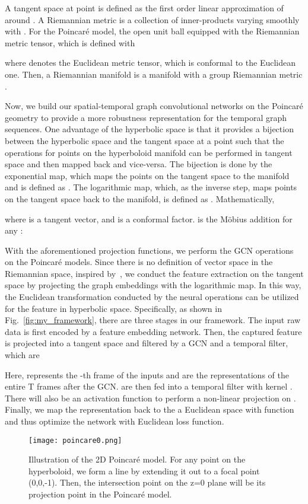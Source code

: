 \documentclass[letterpaper]{article} \usepackage{aaai19}  \usepackage{times}  \usepackage{helvet} \usepackage{courier}  \usepackage[hyphens]{url}  \usepackage{graphicx} \urlstyle{rm} \def\UrlFont{\rm}  \usepackage{graphicx}  \frenchspacing  \setlength{\pdfpagewidth}{8.5in}  \setlength{\pdfpageheight}{11in}
\begin{document}
A tangent space  at point  is defined as the first order linear approximation of  around .
A Riemannian metric  is a collection of inner-products  varying smoothly with . For the Poincar\'e model, the open unit ball equipped with the Riemannian metric tensor, which is defined with

where  denotes the Euclidean metric tensor, which is conformal to the Euclidean one. Then, a Riemannian manifold  is a manifold  with a group Riemannian metric . 

Now, we build our spatial-temporal graph convolutional networks on the Poincar\'e geometry to provide a more robustness representation for the temporal graph sequences. One advantage of the hyperbolic space is that it provides a bijection between the hyperbolic space and the tangent space at a point such that the operations for points on the hyperboloid manifold can be performed in tangent space and then mapped back and vice-versa. The bijection is done by the exponential map, which maps the points on the tangent space to the manifold and is defined as . The logarithmic map, which, as the inverse step, maps points on the tangent space back to the manifold, is defined as . Mathematically,

    


\noindent where  is a tangent vector, and  is a conformal factor.  is the Möbius addition for any :



With the aforementioned projection functions, we perform the GCN operations on the Poincar\'e models. Since there is no definition of vector space in the Riemannian space, inspired by~\cite{ganea2018hyperbolic}, we conduct the feature extraction on the tangent space by projecting the graph embeddings with the logarithmic map. In this way, the Euclidean transformation conducted by the neural operations can be utilized for the feature in hyperbolic space. Specifically, as shown in Fig.~\ref{fig:my_framework}, there are three stages in our framework. The input raw data is first encoded by a feature embedding network. Then, the captured feature is projected into a tangent space and filtered by a GCN and a temporal filter, which are


Here,  represents the -th frame of the inputs and  are the representations of the entire T frames after the GCN.  are then fed into a temporal filter with kernel . There will also be an activation function to perform a non-linear projection on . Finally, we map the representation back to the a Euclidean space with  function and thus optimize the network with Euclidean loss function. 
\begin{figure}
    \centering
    \texttt{[image: poincare0.png]}
    \caption{Illustration of the 2D Poincar\'e model. For any point on the hyperboloid, we form a line by extending it out to a focal point (0,0,-1). Then, the intersection point on the z=0 plane will be its projection point in the Poincar\'e model.}
    \label{fig:poincare}
\end{figure}
\end{document}
